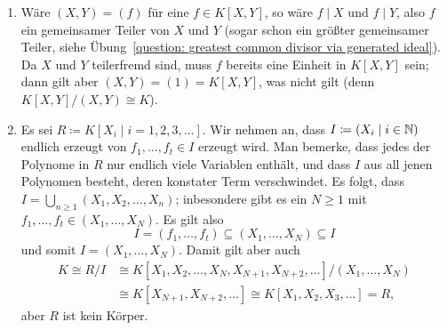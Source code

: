 \begin{solution}
  \begin{enumerate}
    \item
      Wäre $(X,Y) = (f)$ für eine $f \in K[X,Y]$, so wäre $f \mid X$ und $f \mid Y$, also $f$ ein gemeinsamer Teiler von $X$ und $Y$ (sogar schon ein größter gemeinsamer Teiler, siehe Übung~\ref{question: greatest common divisor via generated ideal}).
      Da $X$ und $Y$ teilerfremd sind, muss $f$ bereits eine Einheit in $K[X,Y]$ sein;
      dann gilt aber $(X,Y) = (1) = K[X,Y]$, was nicht gilt (denn $K[X,Y]/(X,Y) \cong K$).
    \item
      Es sei $R \coloneqq K[X_i \mid i = 1, 2, 3, \dotsc]$.
      Wir nehmen an, dass $I \coloneqq (X_i \mid i \in \mathbb{N})$ endlich erzeugt von $f_1, \dotsc, f_t \in I$ erzeugt wird.
      Man bemerke, dass jedes der Polynome in $R$ nur endlich viele Variablen enthält, und dass $I$ aus all jenen Polynomen besteht, deren konstater Term verschwindet.
      Es folgt, dass $I = \bigcup_{n \geq 1} (X_1, X_2, \dotsc, X_n)$;
      inbesondere gibt es ein $N \geq 1$ mit $f_1, \dotsc, f_t \in (X_1, \dotsc, X_N)$.
      Es gilt also
      \[
        I = (f_1, \dotsc, f_t) \subseteq (X_1, \dotsc, X_N) \subseteq I
      \]
      und somit $I = (X_1, \dotsc, X_N)$.
      Damit gilt aber auch
      \begin{align*}
                K
         \cong  R/I
        &\cong  K[X_1, X_2, \dotsc, X_N, X_{N+1}, X_{N+2}, \dotsc]/(X_1, \dotsc, X_N)
        \\
        &\cong  K[X_{N+1}, X_{N+2}, \dotsc]
         \cong  K[X_1, X_2, X_3, \dotsc]
         =      R,
      \end{align*}
      aber $R$ ist kein Körper.
  \end{enumerate}
\end{solution}


% 
% 


